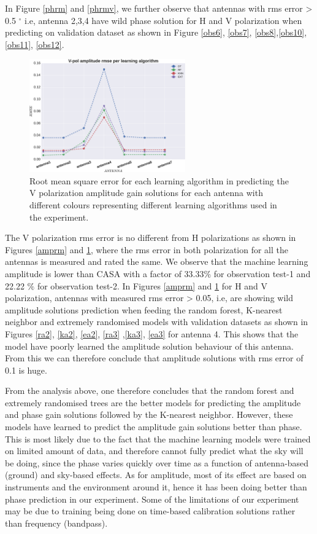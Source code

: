 In Figure \ref{phrm} and \ref{phrmv}, we further observe that antennas with rms error > 0.5 $^\circ$ i.e, antenna 2,3,4 have wild phase solution for H and V polarization when predicting on validation dataset as shown in Figure \ref{obs6}, \ref{obs7}, \ref{obs8},\ref{obs10}, \ref{obs11}, \ref{obs12}. 
\begin{figure}[H]
  \centering
    \includegraphics[width=0.6\textwidth]{images/Vpol-amp.eps}
    \caption{Root mean square error for each learning algorithm in predicting the V polarization amplitude gain solutions for each antenna with different colours representing different learning algorithms used in the experiment.}
  \label{amprmv}
 \end{figure} 

The V polarization rms error is no different from H polarizations as shown in Figures \ref{amprm} and \ref{amprmv}, where the rms error in both polarization for all the antennas is measured and rated the same. We observe that the machine learning amplitude is lower than CASA with a factor of 33.33$\%$ for observation test-1 and 22.22 $\%$ for observation test-2. In Figures \ref{amprm} and \ref{amprmv} for H and V polarization, antennas with measured rms error > 0.05, i.e, are showing wild amplitude solutions prediction when feeding the random forest, K-nearest neighbor and extremely randomised models with validation datasets as shown in Figures  \ref{ra2}, \ref{ka2}, \ref{ea2}, \ref{ra3} ,\ref{ka3}, \ref{ea3} for antenna 4. This shows that the model have poorly learned the amplitude solution behaviour of this antenna. From this we can therefore conclude that amplitude solutions with rms error of 0.1 is huge.

From the analysis above, one therefore concludes that the random forest and extremely randomised trees are the better models for predicting the amplitude and phase gain solutions followed by the K-nearest neighbor. However, these models have learned to predict the amplitude gain solutions better than phase. This is most likely due to the fact that the machine learning models were trained on limited amount of data, and therefore cannot fully predict what the sky will be doing, since the phase varies quickly over time as a function of antenna-based (ground) and sky-based effects. As for amplitude, most of its effect are based on instruments and the environment around it, hence it has been doing better than phase prediction in our experiment. Some of the limitations of our experiment may be due to training being done on time-based calibration solutions rather than frequency (bandpass). 

